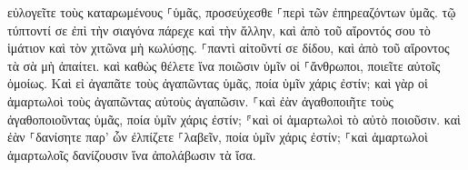 \documentclass{openreader}
\begin{document}
εὐλογεῖτε τοὺς καταρωμένους ⸀ὑμᾶς, προσεύχεσθε ⸀περὶ τῶν ἐπηρεαζόντων ὑμᾶς. 
τῷ τύπτοντί σε ἐπὶ τὴν σιαγόνα πάρεχε καὶ τὴν ἄλλην, καὶ ἀπὸ τοῦ αἴροντός σου τὸ ἱμάτιον καὶ τὸν χιτῶνα μὴ κωλύσῃς. 
⸀παντὶ αἰτοῦντί σε δίδου, καὶ ἀπὸ τοῦ αἴροντος τὰ σὰ μὴ ἀπαίτει. 
καὶ καθὼς θέλετε ἵνα ποιῶσιν ὑμῖν οἱ ⸀ἄνθρωποι, ποιεῖτε αὐτοῖς ὁμοίως. 
Καὶ εἰ ἀγαπᾶτε τοὺς ἀγαπῶντας ὑμᾶς, ποία ὑμῖν χάρις ἐστίν; καὶ γὰρ οἱ ἁμαρτωλοὶ τοὺς ἀγαπῶντας αὐτοὺς ἀγαπῶσιν. 
⸀καὶ ἐὰν ἀγαθοποιῆτε τοὺς ἀγαθοποιοῦντας ὑμᾶς, ποία ὑμῖν χάρις ἐστίν; ⸁καὶ οἱ ἁμαρτωλοὶ τὸ αὐτὸ ποιοῦσιν. 
καὶ ἐὰν ⸀δανίσητε παρ’ ὧν ἐλπίζετε ⸀λαβεῖν, ποία ὑμῖν χάρις ἐστίν; ⸀καὶ ἁμαρτωλοὶ ἁμαρτωλοῖς δανίζουσιν ἵνα ἀπολάβωσιν τὰ ἴσα. 
\end{document}
